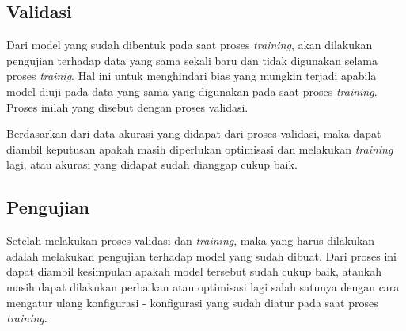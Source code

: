 \subsection{Validasi}

Dari model yang sudah dibentuk pada saat proses \textit{training}, akan dilakukan pengujian terhadap data yang sama sekali baru dan tidak digunakan selama proses \textit{trainig}. Hal ini untuk menghindari bias yang mungkin terjadi apabila model diuji pada data yang sama yang digunakan pada saat proses \textit{training}. Proses inilah yang disebut dengan proses validasi.

Berdasarkan dari data akurasi yang didapat dari proses validasi, maka dapat diambil keputusan apakah masih diperlukan optimisasi dan melakukan \textit{training} lagi, atau akurasi yang didapat sudah dianggap cukup baik.

\subsection{Pengujian}

Setelah melakukan proses validasi dan \textit{training}, maka yang harus dilakukan adalah melakukan pengujian terhadap model yang sudah dibuat. Dari proses ini dapat diambil kesimpulan apakah model tersebut sudah cukup baik, ataukah masih dapat dilakukan perbaikan atau optimisasi lagi salah satunya dengan cara mengatur ulang konfigurasi - konfigurasi yang sudah diatur pada saat proses \textit{training}.
